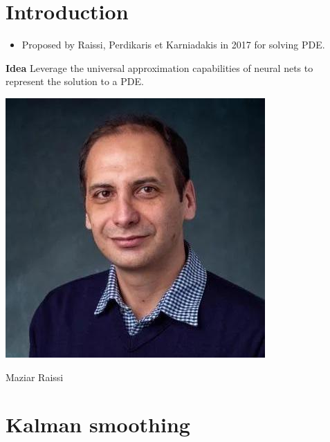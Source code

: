 \documentclass[aspectratio=169,compress,12pt,dvipsnames]{beamer}
\begin{document}
\section{Introduction}

\begin{frame}
  \vfill
  \begin{minipage}{.68\textwidth}
    \begin{itemize}
      \item Proposed by Raissi, Perdikaris et Karniadakis in 2017 for solving PDE.
    \end{itemize}
    \bigskip
    \textbf{Idea}  \hspace{1em}  Leverage the universal approximation capabilities of neural nets to represent the solution to a PDE.
  \end{minipage}%
  \hfill
  \begin{minipage}{.28\textwidth}
    \centering
    \includegraphics[width=\textwidth]{mazar_raissi.jpeg}
    \par
    {\tiny
    Maziar Raissi
    }
  \end{minipage}
  \vfill
\end{frame}

\section{Kalman smoothing}
\end{document}
